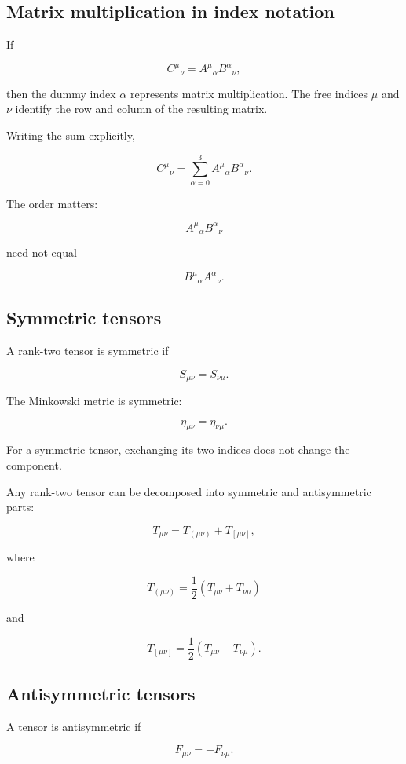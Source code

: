 \subsection{Matrix multiplication in index notation}

If

\[
C^{\mu}{}_{\nu}
=
A^{\mu}{}_{\alpha}
B^{\alpha}{}_{\nu},
\]

then the dummy index \(\alpha\) represents matrix multiplication. The free indices \(\mu\) and \(\nu\) identify the row and column of the resulting matrix.

Writing the sum explicitly,

\[
C^{\mu}{}_{\nu}
=
\sum_{\alpha=0}^{3}
A^{\mu}{}_{\alpha}
B^{\alpha}{}_{\nu}.
\]

The order matters:

\[
A^{\mu}{}_{\alpha}B^{\alpha}{}_{\nu}
\]

need not equal

\[
B^{\mu}{}_{\alpha}A^{\alpha}{}_{\nu}.
\]

\subsection{Symmetric tensors}

A rank-two tensor is symmetric if

\[
\boxed{
S_{\mu\nu}=S_{\nu\mu}
}.
\]

The Minkowski metric is symmetric:

\[
\eta_{\mu\nu}=\eta_{\nu\mu}.
\]

For a symmetric tensor, exchanging its two indices does not change the component.

Any rank-two tensor can be decomposed into symmetric and antisymmetric parts:

\[
T_{\mu\nu}
=
T_{(\mu\nu)}
+
T_{[\mu\nu]},
\]

where

\[
\boxed{
T_{(\mu\nu)}
=
\frac{1}{2}
(T_{\mu\nu}+T_{\nu\mu})
}
\]

and

\[
\boxed{
T_{[\mu\nu]}
=
\frac{1}{2}
(T_{\mu\nu}-T_{\nu\mu})
}.
\]

\subsection{Antisymmetric tensors}

A tensor is antisymmetric if

\[
\boxed{
F_{\mu\nu}=-F_{\nu\mu}
}.
\]

